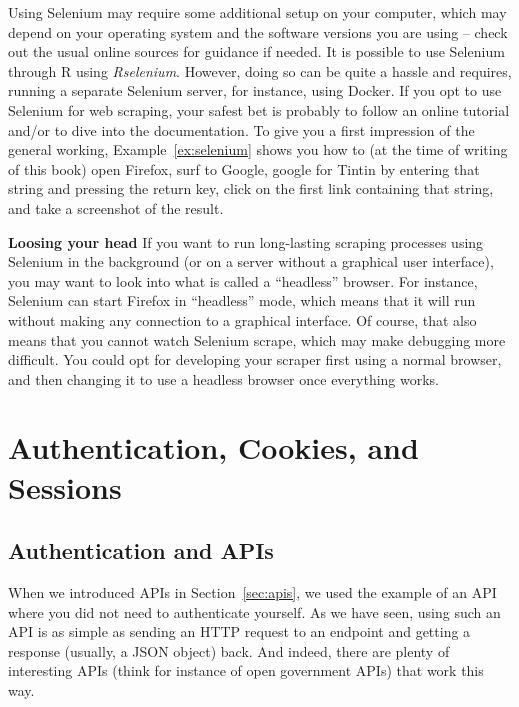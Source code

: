 Using Selenium may require some additional setup on your computer,
which may depend on your operating system and the software versions you
are using -- check out the usual online sources for guidance if
needed.  It is possible to use  Selenium through R using
\emph{Rselenium}. However, doing so can be quite a hassle and requires,
 running a separate Selenium server, for instance,  using
Docker. If you opt to use Selenium for web scraping, your safest bet
is probably to follow an online tutorial and/or to dive into the
documentation. To give you a first impression of the general working,
Example~\ref{ex:selenium} shows you how to (at the time of writing of this
book) open Firefox, surf to Google, google for Tintin by entering that
string and pressing the return key, click on the first link containing
that string, and take a screenshot of the result.



\begin{feature}\textbf{Loosing your head}
If you want to run long-lasting scraping processes using Selenium in
the background (or on a server without a graphical user interface),
you may want to look into what is called a ``headless'' browser. For
instance, Selenium can start Firefox in ``headless'' mode, which means
that it will run without making any connection to a graphical
interface. Of course, that also means that you cannot watch Selenium
scrape, which may make debugging more difficult. You could opt for
developing your scraper first using a normal browser, and then
changing it to use a headless browser once everything works.
\end{feature}

%
\section{Authentication, Cookies, and Sessions}
\label{sec:authentication}

\subsection{Authentication and APIs}
\label{sec:authapi}
When we introduced APIs in Section~\ref{sec:apis}, we used the example of an
API where you did not need to authenticate yourself. As we have seen,
using such an API is as simple as sending an HTTP request to an
endpoint and getting a response (usually, a JSON object) back. And
indeed, there are plenty of interesting APIs (think for instance of
open government APIs) that work this way.

